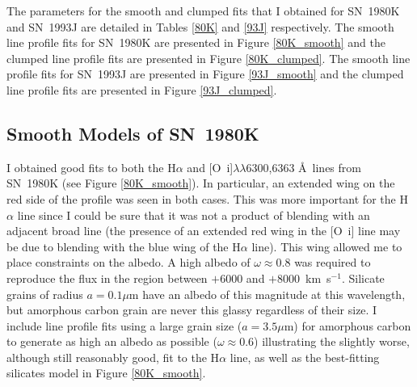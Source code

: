 The parameters for the smooth and clumped fits  that I obtained for SN~1980K and SN~1993J are detailed in Tables \ref{80K} and \ref{93J} respectively. The smooth line profile fits for SN~1980K are presented in Figure \ref{80K_smooth} and the clumped line profile fits are presented in Figure \ref{80K_clumped}.  The smooth line profile fits for SN~1993J are presented in Figure \ref{93J_smooth} and the clumped line profile fits are presented in Figure \ref{93J_clumped}.  

\subsection{Smooth Models of SN~1980K}

I obtained good fits to both the H$\alpha$ and [O~{\sc i}]$\lambda\lambda$6300,6363 \AA\  lines from SN~1980K (see Figure \ref{80K_smooth}).  In particular, an extended wing on the red side of the profile was seen in both cases. This was more important for the H$\alpha$ line since I could be sure that it was not a product of blending with an adjacent broad line (the presence of an extended red wing in the [O~{\sc i}] line may be due to blending with the blue wing of the H$\alpha$ line).  This wing allowed me to place constraints on the albedo.  A high albedo of $\omega\approx0.8$  was required to reproduce the flux in the region between $+6000$ and $+8000$~km~s$^{-1}$.  Silicate grains of radius $a=0.1\mu$m have an albedo of this magnitude at this wavelength, but amorphous carbon grain are never this glassy regardless of their size.  I include line profile fits using a large grain size ($a=3.5\mu$m) for amorphous carbon to generate as high an albedo as possible ($\omega\approx0.6$) illustrating the slightly worse, although still reasonably good, fit to the H$\alpha$ line, as well as the best-fitting silicates model in Figure \ref{80K_smooth}.  

